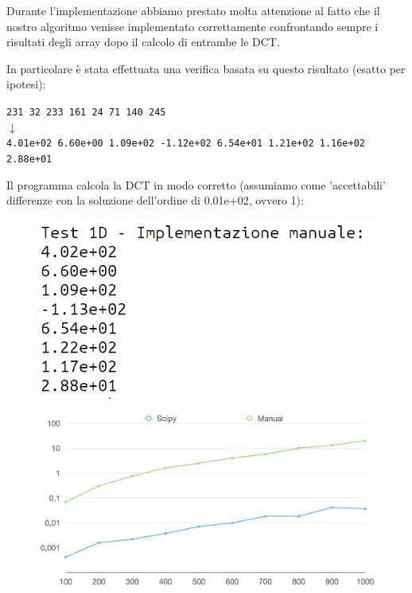 \documentclass[preprint,12pt]{elsarticle}
\begin{document}
Durante l'implementazione abbiamo prestato molta attenzione al fatto che il nostro algoritmo venisse implementato correttamente confrontando sempre i risultati degli array dopo il calcolo di entrambe le DCT.


In particolare è stata effettuata una verifica basata su questo risultato (esatto per ipotesi):

\begin{center}
	\texttt{231 32 233 161 24 71 140 245}\\
	\vspace{2mm}
	$\downarrow$\\
	\vspace{2mm}
	\texttt{4.01e+02 6.60e+00 1.09e+02 -1.12e+02 6.54e+01 1.21e+02 1.16e+02 2.88e+01
}
\end{center}

Il programma calcola la DCT in modo corretto (assumiamo come 'accettabili' differenze con la soluzione dell'ordine di 0.01e+02, ovvero 1):

\begin{figure}[H]
	\centering
	\includegraphics[width=0.7\linewidth]{screentest}
\end{figure}

\begin{figure}[H]
	\centering
	\includegraphics[width=\linewidth]{grafico}
\end{figure}
\end{document}
